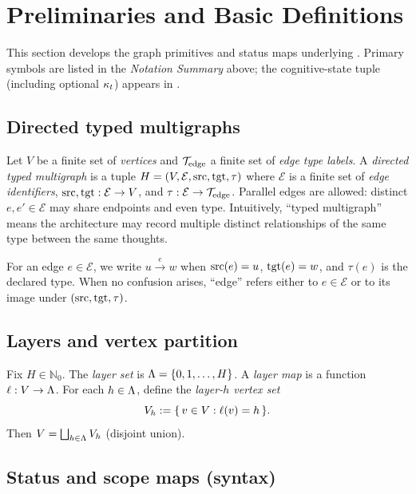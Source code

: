 \section{Preliminaries and Basic Definitions}
\label{sec:preliminaries}\label{sec:background}

This section develops the graph primitives and status maps underlying .
Primary symbols are listed in the \emph{Notation Summary} above; the cognitive-state tuple (including optional $\kappa_t$) appears in .

\subsection{Directed typed multigraphs}
\label{sec:prelim-graphs}

Let $V$ be a finite set of \emph{vertices} and $\mathcal{T}_{\mathrm{edge}}$ a finite set of \emph{edge type labels}.
A \emph{directed typed multigraph} is a tuple $H=(V,\mathcal{E},\mathrm{src},\mathrm{tgt},\tau)$ where $\mathcal{E}$ is a finite set of \emph{edge identifiers},
$\mathrm{src},\mathrm{tgt}:\mathcal{E}\to V$, and $\tau:\mathcal{E}\to\mathcal{T}_{\mathrm{edge}}$.
Parallel edges are allowed: distinct $e,e'\in\mathcal{E}$ may share endpoints and even type.
Intuitively, ``typed multigraph'' means the architecture may record multiple distinct relationships of the same type between the same thoughts.

For an edge $e\in\mathcal{E}$, we write $u\xrightarrow{e}w$ when $\mathrm{src}(e)=u$, $\mathrm{tgt}(e)=w$, and $\tau(e)$ is the declared type.
When no confusion arises, ``edge'' refers either to $e\in\mathcal{E}$ or to its image under $(\mathrm{src},\mathrm{tgt},\tau)$.

\subsection{Layers and vertex partition}
\label{sec:prelim-layers}

Fix $H\in\mathbb{N}_0$.
The \emph{layer set} is $\Lambda=\{0,1,\ldots,H\}$.
A \emph{layer map} is a function $\ell:V\to\Lambda$.
For each $h\in\Lambda$, define the \emph{layer-$h$ vertex set}
\[
  V_{h} := \{\, v\in V : \ell(v)=h \,\}.
\]
Then $V=\bigsqcup_{h\in\Lambda}V_{h}$ (disjoint union).

\subsection{Status and scope maps (syntax)}
\label{sec:prelim-status}

